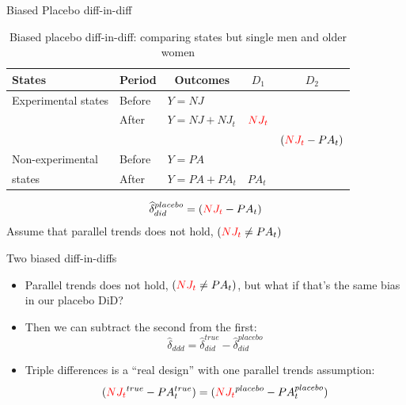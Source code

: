 \documentclass{beamer}
\begin{document}
\begin{frame}{Biased Placebo diff-in-diff}

\begin{table}\centering
\scriptsize
		\caption{Biased placebo diff-in-diff: comparing states but single men and older women}
		\begin{center}
		\begin{tabular}{lll|lc}
		\toprule
		\multicolumn{1}{l}{\textbf{States}}&
		\multicolumn{1}{c}{\textbf{Period}}&
		\multicolumn{1}{c}{\textbf{Outcomes}}&
		\multicolumn{1}{c}{$D_1$}&
		\multicolumn{1}{c}{$D_2$}\\
		\midrule
		Experimental states & Before & $Y=NJ$ \\
		& After & $Y=NJ + NJ_t $ & $\textcolor{red}{NJ_t}$\\
		\midrule
		& & & & $ (\textcolor{red}{NJ_t}- PA_t)$ \\
		\midrule
		Non-experimental  & Before & $Y=PA$ \\
		states& After & $Y=PA + PA_t$ & $PA_t$\\
		\bottomrule
		\end{tabular}
		\end{center}
	\end{table}

\begin{eqnarray*}
\widehat{\delta}^{placebo}_{did} = (\textcolor{red}{NJ_t}- PA_t)
\end{eqnarray*}Assume that parallel trends does not hold, $(\textcolor{red}{NJ_t} \neq PA_t)$

\end{frame}


\begin{frame}{Two biased diff-in-diffs}

\begin{itemize}


\item Parallel trends does not hold, $(\textcolor{red}{NJ_t} \neq PA_t)$, but what if that's the same bias in our placebo DiD?
\item Then we can subtract the second from the first: $$ \widehat{\delta}_{ddd} = \widehat{\delta}^{true}_{did} - \widehat{\delta}^{placebo}_{did}$$
\item Triple differences is a ``real design'' with one parallel trends assumption: $$(\textcolor{red}{NJ_t}^{true}- PA_t^{true}) = (\textcolor{red}{NJ_t}^{placebo}- PA_t^{placebo})$$

\end{itemize}

\end{frame}
\end{document}

